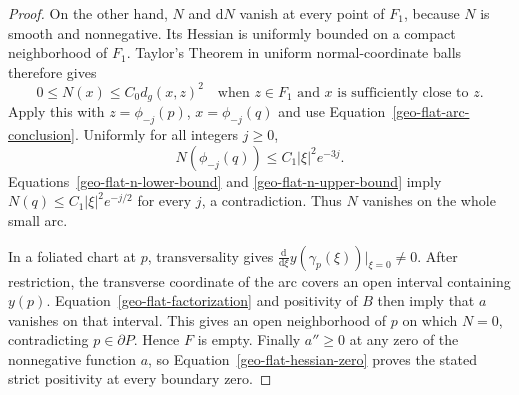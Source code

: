 \begin{proof}
On the other hand, $N$ and $\mathrm dN$ vanish at every point of $F_1$,
because $N$ is smooth and nonnegative.  Its Hessian is uniformly bounded
on a compact neighborhood of $F_1$.  Taylor's Theorem in uniform
normal-coordinate balls therefore gives
\[
 0\leq N(x)\leq C_0d_g(x,z)^2
 \quad\text{when }z\in F_1\text{ and }x\text{ is sufficiently close to }z.
\]
Apply this with $z=\phi_{-j}(p)$, $x=\phi_{-j}(q)$ and use
Equation~\eqref{geo-flat-arc-conclusion}.  Uniformly for all integers
$j\geq0$,
\begin{equation}
\label{geo-flat-n-upper-bound}
 N(\phi_{-j}(q))\leq C_1\lvert\xi\rvert^2e^{-3j}.
\end{equation}
Equations~\eqref{geo-flat-n-lower-bound} and
\eqref{geo-flat-n-upper-bound} imply
$N(q)\leq C_1\lvert\xi\rvert^2e^{-j/2}$ for every $j$, a
contradiction.  Thus $N$ vanishes on the whole small arc.

In a foliated chart at $p$, transversality gives
$\frac{\mathrm d}{\mathrm d\xi}y(\gamma_p(\xi))|_{\xi=0}\ne0$.
After restriction, the transverse coordinate of the arc covers an open
interval containing $y(p)$.  Equation~\eqref{geo-flat-factorization}
and positivity of $B$ then imply that $a$ vanishes on that interval.
This gives an open neighborhood of $p$ on which $N=0$, contradicting
$p\in\partial P$.  Hence $F$ is empty.  Finally $a''\geq0$ at any zero
of the nonnegative function $a$, so
Equation~\eqref{geo-flat-hessian-zero} proves the stated strict
positivity at every boundary zero.
\end{proof}


